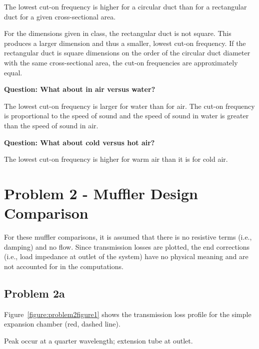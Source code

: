  The lowest cut-on frequency is higher for a circular duct than for a
 rectangular duct for a given cross-sectional area.

 For the dimensions given in class, the rectangular duct is not square.
 This produces a larger dimension and thus a smaller, lowest cut-on
 frequency.  If the rectangular duct is square dimensions on the order
 of the circular duct diameter with the same cross-sectional area, the
 cut-on frequencies are approximately equal.



\vspace{0.25cm}
\textbf{Question:  What about in air versus water?}

 The lowest cut-on frequency is larger for water than for air.  The cut-on
 frequency is proportional to the speed of sound and the speed of sound in
 water is greater than the speed of sound in air.



\vspace{0.25cm}
\textbf{Question:  What about cold versus hot air?}

 The lowest cut-on frequency is higher for warm air than it is for cold air.









\newpage
\section*{Problem 2 - Muffler Design Comparison}

For these muffler comparisons, it is assumed that there is no resistive terms (i.e., damping) and no flow.  Since transmission losses are plotted, the end corrections (i.e., load impedance at outlet of the system) have no physical meaning and are not accounted for in the computations.

   
\subsection*{Problem 2a}

Figure~\ref{figure:problem2figure1} shows the transmission loss profile for the simple expansion chamber (red, dashed line).





Peak occur at a quarter wavelength;  extension tube at outlet.

